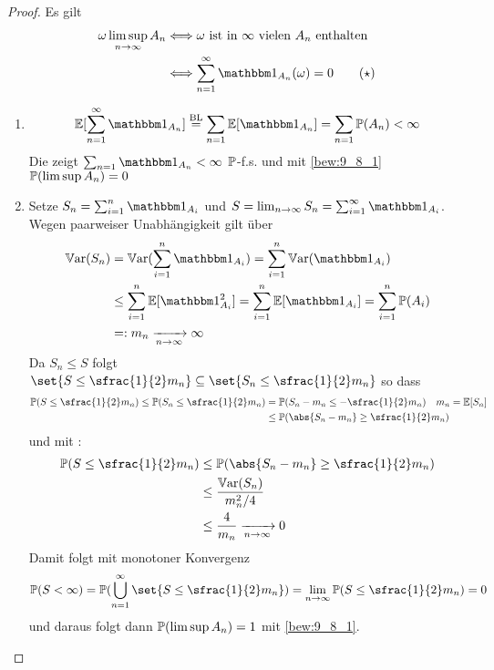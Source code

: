 \begin{proof}
	Es gilt
	\begin{align*}
		\omega \limsup_{n \to \infty} A_n &\Longleftrightarrow \omega \text{ ist in } \infty \text{ vielen } A_n \text{ enthalten}\\
		&\Longleftrightarrow \sum_{n=1}^{\infty} \indi_{A_n}(\omega) = 0 \tag{$\star$} \label{bew:9_8_1}
	\end{align*}
	\begin{enumerate}
		\item 
		\begin{align*}
			\E[\sum_{n=1}^{\infty} \indi_{A_n}] \overset{\text{BL}}{=} \sum_{n=1} \E[\indi_{A_n}] = \sum_{n=1}\P(A_n) < \infty
		\end{align*}
		Die zeigt $\sum_{n=1} \indi_{A_n} < \infty$ $\P$-f.s. und mit \eqref{bew:9_8_1} $\P(\limsup A_n) = 0$
		\item Setze $S_n = \sum_{i=1}^n \indi_{A_i}$ und $S= \lim_{n\to \infty} S_n = \sum_{i=1}^{\infty} \indi_{A_i}$. Wegen paarweiser Unabhängigkeit gilt über 
		\begin{align*}
			\Var(S_n) &= \Var(\sum^n_{i=1} \indi_{A_i}) = \sum_{i=1}^n \Var(\indi_{A_i})\\
			&\le \sum_{i=1}^n \E[\indi^2_{A_i}] = \sum_{i=1}^n \E[\indi_{A_i}] = \sum_{i=1}^n \P(A_i)\\
			&=: m_n \xrightarrow[n \to \infty]{}\infty
		\end{align*}
		Da $S_n \le S$ folgt $\set{S\le \sfrac{1}{2}m_n}\subseteq \set{S_n \le \sfrac{1}{2} m_n}$ so dass
		\begin{align*}
			\P(S \le \sfrac{1}{2} m_n) \le \P(S_n \le \sfrac{1}{2} m_n) &= \P(S_n - m_n \le - \sfrac{1}{2} m_n) \quad m_n = \E[S_n]\\
			&\le \P(\abs{S_n - m_n} \ge \sfrac{1}{2}m_n)
		\end{align*}
		und mit :
		\begin{align*}
			\P(S \le \sfrac{1}{2} m_n) &\le \P(\abs{S_n - m_n} \ge \sfrac{1}{2}m_n)\\
			&\le \frac{\Var(S_n)}{m_n^2/4}\\
			&\le \frac{4}{m_n} \xrightarrow[n \to \infty]{} 0
		\end{align*}
		Damit folgt mit monotoner Konvergenz
		\begin{align*}
			\P(S < \infty) = \P(\bigcup_{n=1}^{\infty} \set{S \le \sfrac{1}{2}m_n}) = \lim_{n\to \infty} \P(S \le \sfrac{1}{2} m_n) = 0
		\end{align*}
		und daraus folgt dann $\P(\limsup A_n) = 1$ mit \eqref{bew:9_8_1}.
	\end{enumerate}
\end{proof}
